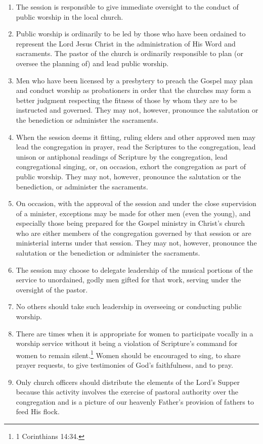 \documentclass[
]{book}
\providecommand{\tightlist}{%
  \setlength{\itemsep}{0pt}\setlength{\parskip}{0pt}}
\begin{document}
\begin{enumerate}
  \begin{enumerate}
  \def\labelenumii{\alph{enumii}.}
  \tightlist
  \item
    The session is responsible to give immediate oversight to the conduct of public worship in the local church.
  \item
    Public worship is ordinarily to be led by those who have been ordained to represent the Lord Jesus Christ in the administration of His Word and sacraments. The pastor of the church is ordinarily responsible to plan (or oversee the planning of) and lead public worship.
  \item
    Men who have been licensed by a presbytery to preach the Gospel may plan and conduct worship as probationers in order that the churches may form a better judgment respecting the fitness of those by whom they are to be instructed and governed. They may not, however, pronounce the salutation or the benediction or administer the sacraments.
  \item
    When the session deems it fitting, ruling elders and other approved men may lead the congregation in prayer, read the Scriptures to the congregation, lead unison or antiphonal readings of Scripture by the congregation, lead congregational singing, or, on occasion, exhort the congregation as part of public worship. They may not, however, pronounce the salutation or the benediction, or administer the sacraments.
  \item
    On occasion, with the approval of the session and under the close supervision of a minister, exceptions may be made for other men (even the young), and especially those being prepared for the Gospel ministry in Christ's church who are either members of the congregation governed by that session or are ministerial interns under that session. They may not, however, pronounce the salutation or the benediction or administer the sacraments.
  \item
    The session may choose to delegate leadership of the musical portions of the service to unordained, godly men gifted for that work, serving under the oversight of the pastor.
  \item
    No others should take such leadership in overseeing or conducting public worship.
  \item
    There are times when it is appropriate for women to participate vocally in a worship service without it being a violation of Scripture's command for women to remain silent.\footnote{1 Corinthians 14:34.} Women should be encouraged to sing, to share prayer requests, to give testimonies of God's faithfulness, and to pray.
  \item
    Only church officers should distribute the elements of the Lord's Supper because this activity involves the exercise of pastoral authority over the congregation and is a picture of our heavenly Father's provision of fathers to feed His flock.
  \end{enumerate}
\end{enumerate}
\end{document}
